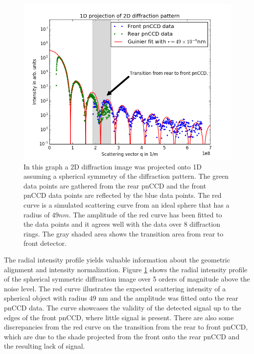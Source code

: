 \begin{figure}
	\centering
		\includegraphics[height=0.50\textwidth]{images/pnCCD-1d-sum.png}
	\caption{In this graph a 2D diffraction image was projected onto 1D assuming a spherical symmetry of the diffraction pattern. The green data points are gathered from the rear pnCCD and the front pnCCD data points are reflected by the blue data points. The red curve is a simulated scattering curve from an ideal sphere that has a radius of $49 nm$. The amplitude of the red curve has been fitted to the data points and it agrees well with the data over 8 diffraction rings. The gray shaded area shows the transition area from rear to front detector.}
	\label{fig:pnCCD-1d-sum}
\end{figure}
The radial intensity profile yields valuable information about the geometric alignment and intensity normalization. Figure \ref{fig:pnCCD-1d-sum} shows the radial intensity profile of the spherical symmetric diffraction image over 5 orders of magnitude above the noise level. The red curve illustrates the expected scattering intensity of a spherical object with radius $49$ nm and the amplitude was fitted onto the rear pnCCD data. The curve showcases the validity of the detected signal up to the edges of the front pnCCD, where little signal is present. There are also some discrepancies from the red curve on the transition from the rear to front pnCCD, which are due to the shade projected from the front onto the rear pnCCD and the resulting lack of signal.
%
%
%

